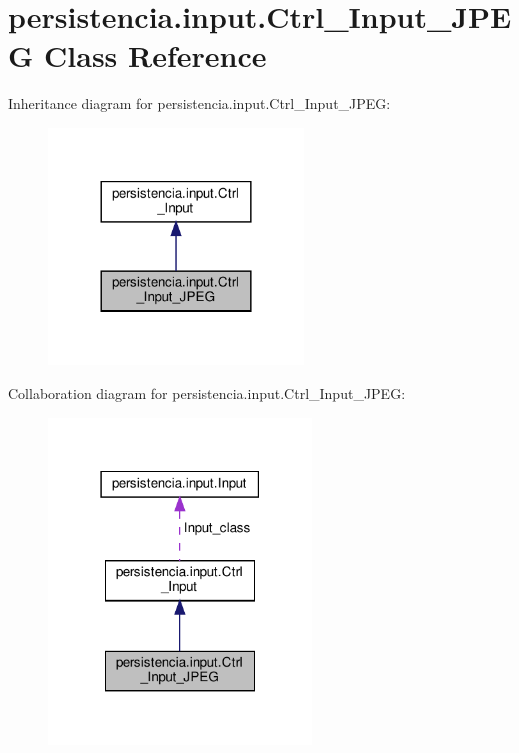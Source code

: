\hypertarget{classpersistencia_1_1input_1_1Ctrl__Input__JPEG}{}\section{persistencia.\+input.\+Ctrl\+\_\+\+Input\+\_\+\+J\+P\+EG Class Reference}
\label{classpersistencia_1_1input_1_1Ctrl__Input__JPEG}


Inheritance diagram for persistencia.\+input.\+Ctrl\+\_\+\+Input\+\_\+\+J\+P\+EG\+:
\nopagebreak
\begin{figure}[H]
\begin{center}
\leavevmode
\includegraphics[width=192pt]{classpersistencia_1_1input_1_1Ctrl__Input__JPEG__inherit__graph}
\end{center}
\end{figure}


Collaboration diagram for persistencia.\+input.\+Ctrl\+\_\+\+Input\+\_\+\+J\+P\+EG\+:
\nopagebreak
\begin{figure}[H]
\begin{center}
\leavevmode
\includegraphics[width=198pt]{classpersistencia_1_1input_1_1Ctrl__Input__JPEG__coll__graph}
\end{center}
\end{figure}
